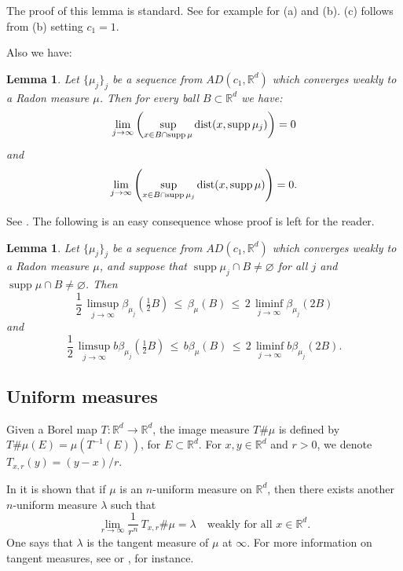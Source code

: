 \documentclass[11pt]{amsart}
\newcommand{\R}{{\mathbb R}}       %
\newcommand{\dist}{{\rm dist}}
\newcommand{\supp}{\operatorname{supp}}
\newcommand{\vv}{{\vspace{2mm}}}
\newtheorem{lemma}[theorem]{Lemma}
\theoremstyle{definition}
\theoremstyle{remark}
\numberwithin{equation}{section}
\begin{document}
The proof of this lemma is standard. See for example \cite[Lemma III.5.8]{DS} for (a) and (b). (c) follows from (b) setting $c_1=1$.

Also we have:

\begin{lemma}\label{lemconbeta1}
Let $\{\mu_j\}_j$ be a sequence from $AD(c_1,\R^d)$ which converges weakly to a Radon measure $\mu$.
Then for every ball $B\subset\R^d$ we have:
$$\lim_{j\to\infty}\left(\sup_{x\in B\cap \supp\mu}\dist(x,\supp\mu_j)\right) = 0$$
and 
$$\lim_{j\to\infty}\left(\sup_{x\in B\cap \supp\mu_j}\dist(x,\supp\mu)\right) = 0.$$
\end{lemma}

See \cite[Lemma III.5.9]{DS}.
The following is an easy consequence whose proof is left for the reader.

\begin{lemma}\label{lemconbeta2}
Let $\{\mu_j\}_j$ be a sequence from $AD(c_1,\R^d)$ which converges weakly to a Radon measure $\mu$, and suppose that $\supp\mu_j\cap B\neq\varnothing$ for all $j$ and $\supp\mu\cap B\neq\varnothing$.
Then
\begin{equation}\label{eqd29}
\frac12\,\limsup_{j\to\infty}\beta_{\mu_j}(\tfrac12 B) \,\leq\, \beta_\mu(B)\, \leq \,
2\,\liminf_{j\to\infty}\beta_{\mu_j}(2 B)
\end{equation}
and
\begin{equation}\label{eqd29b}
\frac12\,\limsup_{j\to\infty}b\beta_{\mu_j}(\tfrac12 B) \,\leq\, b\beta_\mu(B)\, \leq \,
2\,\liminf_{j\to\infty}b\beta_{\mu_j}(2 B).
\end{equation}
\end{lemma}




\vv


\subsection{Uniform measures}

Given a Borel map $T:\R^d\to\R^d$, the image measure $T\#\mu$ is defined by
$T\#\mu(E)=\mu(T^{-1}(E))$, for $E\subset \R^d$.
For $x,y\in\R^d$ and $r>0$, we denote $T_{x,r}(y)=(y-x)/r$.


In \cite[Theorem 3.11]{Pr} it is shown that if $\mu$ is an $n$-uniform measure on $\R^d$, then there exists another $n$-uniform measure $\lambda$ such that
$$\lim_{r\to\infty}\frac1{r^n}\,T_{x,r}\#\mu=\lambda\quad \mbox{weakly for all $x\in\R^d$}.$$
One says that $\lambda$ is the tangent measure of $\mu$ at $\infty$. For more information on tangent measures, see \cite{Pr} or \cite[Chapters 14-17]{Mattila}, for instance.
\end{document}
